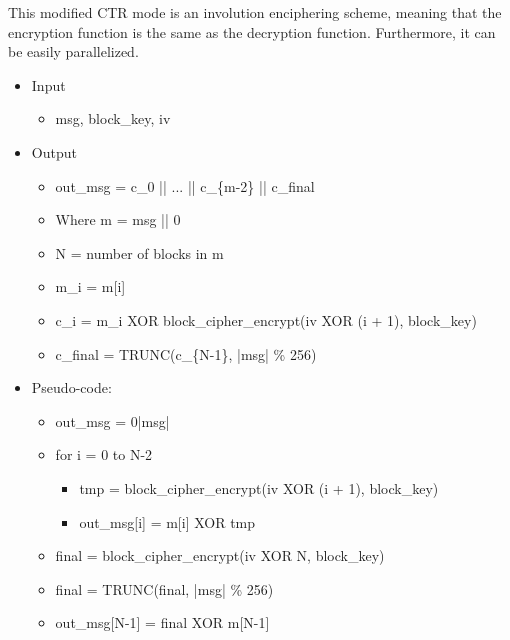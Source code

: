 \documentclass[i-d]{rfc}
\begin{document}
This modified CTR mode is an involution enciphering scheme, meaning that the encryption function is the same as the decryption function. Furthermore, it can be easily parallelized.
\begin{itemize}
    \item Input
    \begin{itemize}
        \item msg, block\_key, iv
    \end{itemize}
    \item Output
    \begin{itemize}
        \item out\_msg = c\_0 || ... || c\_\{m-2\} || c\_final
        \item Where m = msg || 0\pow *
        \item N = number of blocks in m
        \item m\_i = m[i]
        \item c\_i = m\_i XOR block\_cipher\_encrypt(iv XOR (i + 1), block\_key)
        \item c\_final = TRUNC(c\_\{N-1\}, |msg| \% 256)
    \end{itemize}
    \item Pseudo-code:
    \begin{itemize}
        \item out\_msg = 0\pow|msg|
        \item for i = 0 to N-2
        \begin{itemize}
            \item tmp = block\_cipher\_encrypt(iv XOR (i + 1), block\_key)
            \item out\_msg[i] = m[i] XOR tmp
        \end{itemize}
        \item final = block\_cipher\_encrypt(iv XOR N, block\_key)
        \item final = TRUNC(final, |msg| \% 256)
        \item out\_msg[N-1] = final XOR m[N-1]
    \end{itemize}
\end{itemize}
\end{document}
